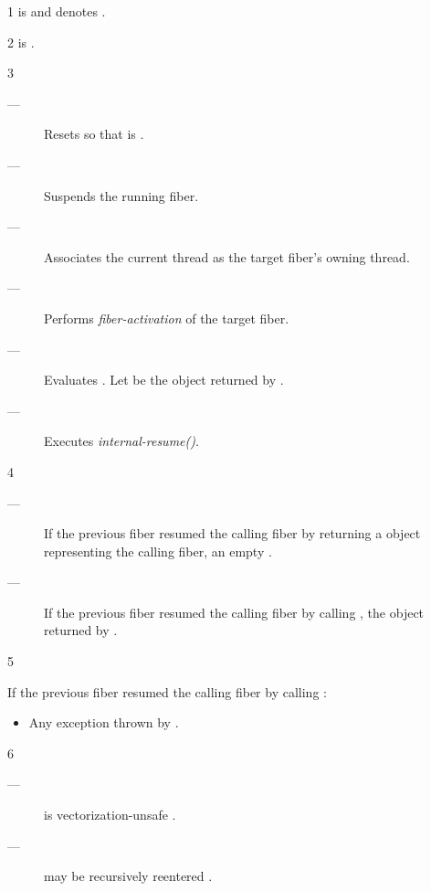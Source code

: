 1 \mandates
{} is \true
and  denotes \fiber\cpp{\&\&}.

2 \precond
{} is \true.

3 \effects
\begin{description}
    \item[---] Resets \state so that  is \true.
    \item[---] Suspends the running fiber.
    \item[---] Associates the current thread as the target fiber's owning thread.
    \item[---] Performs \emph{fiber-activation} of the target fiber.
    \item[---] Evaluates .
               Let  be the \fiber object returned by .
    \item[---] Executes \emph{internal-resume()}.
\end{description}

4 \returns

\begin{description}
    \item[---] If the previous fiber resumed the calling fiber by returning
          a \fiber object representing the calling fiber, an empty \fiber.
    \item[---] If the previous fiber resumed the calling fiber by
          calling , the \fiber object returned
          by .
\end{description}

5 \except

If the previous fiber resumed the calling fiber by calling :
\begin{itemize}
    \item Any exception thrown by .
\end{itemize}


6 \remarks

\begin{description}
    \item[---] \resumewith is vectorization-unsafe .
    \item[---] \resumewith may be recursively reentered .
\end{description}

